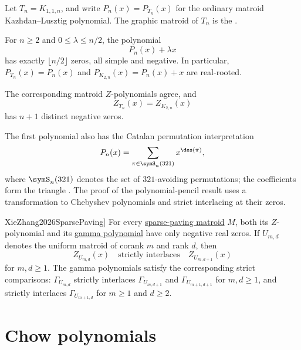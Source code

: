 Let $T_n=K_{1,1,n}$, and write $P_n(x)=P_{T_n}(x)$ for the ordinary matroid
Kazhdan--Lusztig polynomial.  The graphic matroid of $T_n$ is the
\label{thagomizerMatroid}.

\begin{theorem}
\label{thagomizerKazhdanLusztigRealRooted}
For $n\geq 2$ and $0\leq\lambda\leq n/2$, the polynomial
\[
  P_n(x)+\lambda x
\]
has exactly $\lfloor n/2\rfloor$ zeros, all simple and negative.  In
particular, $P_{T_n}(x)=P_n(x)$ and
$P_{K_{2,n}}(x)=P_n(x)+x$ are real-rooted.

The corresponding matroid $Z$-polynomials agree, and
\[
  Z_{T_n}(x)=Z_{K_{2,n}}(x)
\]
has $n+1$ distinct negative zeros.
\end{theorem}

The first polynomial also has the Catalan permutation interpretation
\[
  P_n(x)=\sum_{\pi\in\symS_n(321)}x^{\des(\pi)},
\]
where $\symS_n(321)$ denotes the set of $321$-avoiding permutations; the
coefficients form the triangle .  The
proof of the polynomial-pencil result uses a transformation to Chebyshev
polynomials and strict interlacing at their zeros.

\begin{theorem}[Xie--Zhang, \cite[Thms.~1.1--1.3]{XieZhang2026SparsePaving}]
For every \hyperref[sparsePavingMatroid]{sparse-paving matroid} $M$, both its
$Z$-polynomial and its \hyperref[gammaPolynomial]{gamma polynomial} have only
negative real zeros.  If
$U_{m,d}$ denotes the uniform matroid of corank $m$ and rank $d$, then
\[
  Z_{U_{m,d}}(x)\quad\text{strictly interlaces}\quad Z_{U_{m,d+1}}(x)
\]
for $m,d\geq1$.  The gamma polynomials satisfy the corresponding strict
comparisons: $\Gamma_{U_{m,d}}$ strictly interlaces
$\Gamma_{U_{m,d+1}}$ and $\Gamma_{U_{m+1,d+1}}$ for $m,d\geq1$, and strictly
interlaces $\Gamma_{U_{m+1,d}}$ for $m\geq1$ and $d\geq2$.
\end{theorem}



\section[matroidChowPolynomials]{Chow polynomials}
\label{matroidChowRing}

